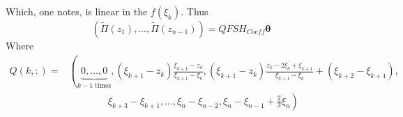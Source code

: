 \documentclass{article}
\newcommand{\bs}{\boldsymbol}                               %
\begin{document}
Which, one notes, is linear in the $f(\xi_k)$. Thus 
\[ (\tilde{\Pi}(z_1), \dots , \tilde{\Pi}(z_{n-1})) = QFSH_{Coeff}\bs{\theta} \] 
Where
\begin{align*}
 Q(k,:) =& \left(\underbrace{0, \dots , 0}_{k-1 \mbox{ times}}, (\xi_{k+1}-z_k) 
\frac{\xi_{k+1}-z_k}{\xi_{k+1}-\xi_k},  (\xi_{k+1}-z_k) \frac{z_k - 2 \xi_k 
+\xi_{k+1}}{\xi_{k+1}-\xi_k} + (\xi_{k+2}-\xi_{k+1}), \right. \\[4pt]
& \qquad\qquad \left. \xi_{k+3}-\xi_{k+1}, \dots, \xi_{n}-\xi_{n-2}, 
\xi_{n}-\xi_{n-1} + \frac{2}{3}\xi_n  \right)
\end{align*}
%
%
%
%
%
%
\end{document}
